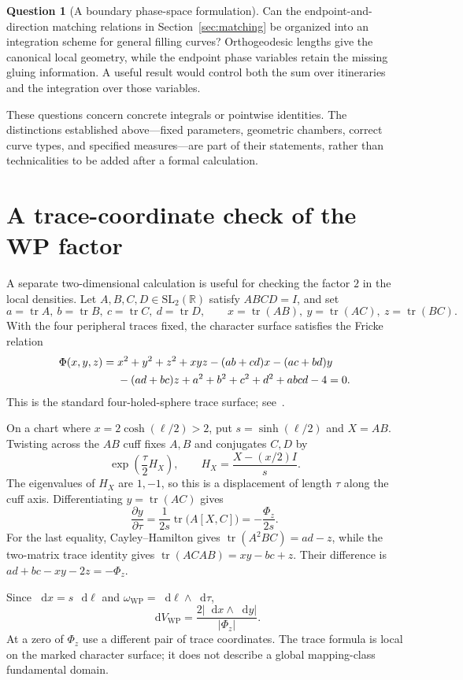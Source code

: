 \documentclass[11pt,a4paper]{article}
\numberwithin{equation}{section}
\theoremstyle{definition}
\newtheorem{question}[theorem]{Question}
\theoremstyle{remark}
\DeclareMathOperator{\tr}{tr}
\newcommand{\dd}{\mathop{}\!\mathrm d}
\newcommand{\WP}{\mathrm{WP}}
\newcommand{\RR}{\mathbb R}
\newcommand{\dV}{\dd V_{\WP}}
\begin{document}
\begin{question}[A boundary phase-space formulation]
Can the endpoint-and-direction matching relations in
Section~\ref{sec:matching} be organized into an integration scheme for
general filling curves? Orthogeodesic lengths give the canonical local
geometry, while the endpoint phase variables retain the missing gluing
information. A useful result would control both the sum over itineraries
and the integration over those variables.
\end{question}

These questions concern concrete integrals or pointwise identities. The
distinctions established above---fixed parameters, geometric chambers,
correct curve types, and specified measures---are part of their statements,
rather than technicalities to be added after a formal calculation.

\appendix
\section{A trace-coordinate check of the WP factor}
\label{app:fricke}

A separate two-dimensional calculation is useful for checking the factor
$2$ in the local densities. Let $A,B,C,D\in\mathrm{SL}_2(\RR)$ satisfy
$ABCD=I$, and set
\[
 a=\tr A,\ b=\tr B,\ c=\tr C,\ d=\tr D,
 \qquad x=\tr(AB),\ y=\tr(AC),\ z=\tr(BC).
\]
With the four peripheral traces fixed, the character surface satisfies
the Fricke relation
\begin{align}
 \Phi(x,y,z)={}&x^2+y^2+z^2+xyz-(ab+cd)x-(ac+bd)y\notag\\
 &-(ad+bc)z+a^2+b^2+c^2+d^2+abcd-4=0.
 \label{eq:fricke}
\end{align}
This is the standard four-holed-sphere trace surface; see~\cite{Goldman}.

On a chart where $x=2\cosh(\ell/2)>2$, put $s=\sinh(\ell/2)$ and
$X=AB$. Twisting across the $AB$ cuff fixes $A,B$ and conjugates $C,D$ by
\[
 \exp\left(\frac{\tau}{2}H_X\right),
 \qquad H_X=\frac{X-(x/2)I}{s}.
\]
The eigenvalues of $H_X$ are $1,-1$, so this is a displacement of length
$\tau$ along the cuff axis. Differentiating $y=\tr(AC)$ gives
\[
 \frac{\partial y}{\partial\tau}
 =\frac1{2s}\tr\bigl(A[X,C]\bigr)
 =-\frac{\Phi_z}{2s}.
\]
For the last equality, Cayley--Hamilton gives
$\tr(A^2BC)=ad-z$, while the two-matrix trace identity gives
$\tr(ACAB)=xy-bc+z$. Their difference is
$ad+bc-xy-2z=-\Phi_z$.

Since $\dd x=s\,\dd\ell$ and $\omega_{\WP}=\dd\ell\wedge\dd\tau$,
\begin{equation}
 \boxed{\dV=\frac{2|\dd x\wedge\dd y|}{|\Phi_z|}.}
 \label{eq:frickedensity}
\end{equation}
At a zero of $\Phi_z$ use a different pair of trace coordinates. The
trace formula is local on the marked character surface; it does not
describe a global mapping-class fundamental domain.
\end{document}
